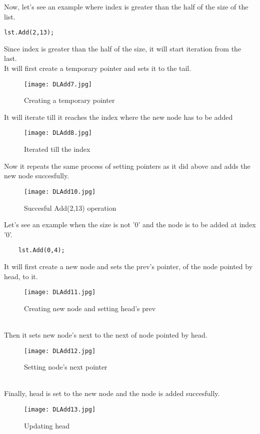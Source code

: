 \documentclass[11pt,fleqn]{book} %
\begin{document}
\begin{example}
Now, let's see an example where index is greater than the half of the size of the list.\\
\begin{lstlisting}
lst.Add(2,13);
\end{lstlisting}
Since index is greater than the half of the size, it will start iteration from the last.\\
It will first create a temporary pointer and sets it to the tail.
\begin{figure}[H]
	\centering
	\texttt{[image: DLAdd7.jpg]}
	\caption{Creating a temporary pointer}
\end{figure}
It will iterate till it reaches the index where the new node has to be added
\begin{figure}[H]
	\centering
	\texttt{[image: DLAdd8.jpg]}
	\caption{Iterated till the index}
\end{figure}
Now it repeats the same process of setting pointers as it did above and adds the new node succesfully.
\begin{figure}[H]
	\centering
	\texttt{[image: DLAdd10.jpg]}
	\caption{Succesful Add(2,13) operation}
\end{figure}
\end{example}
Let's see an example when the size is not '0' and the node is to be added at index '0'.
\begin{example}
	\begin{lstlisting}
	lst.Add(0,4);
	\end{lstlisting}
It will first create a new node and sets the prev's pointer, of the node pointed by head, to it.
\begin{figure}[H]
	\centering
	\texttt{[image: DLAdd11.jpg]}
	\caption{Creating new node and setting head's prev}
\end{figure}~\\
Then it sets new node's next to the next of node pointed by head.
\begin{figure}[H]
	\centering
	\texttt{[image: DLAdd12.jpg]}
	\caption{Setting node's next pointer}
\end{figure}~\\
Finally, head is set to the new node and the node is added succesfully.
\begin{figure}[H]
	\centering
	\texttt{[image: DLAdd13.jpg]}
	\caption{Updating head}
\end{figure}
\end{example}
\end{document}
